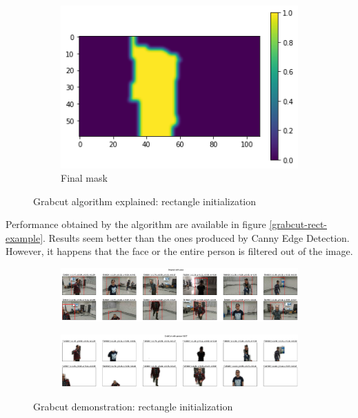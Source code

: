 \begin{figure}[!h]
\begin{center}
\begin{subfigure}[h]{0.32\textwidth}
			\includegraphics[width=1\textwidth]{"contents/images/04-2grabcut-1rect-steps-3"}
			\caption[]{Final mask}
			\label{fig:grabcut-rect-explain-3}
		\end{subfigure}
	\end{center}
	\vspace{-0.5cm}
	\caption[Grabcut algorithm explained: rectangle initialization]{Grabcut algorithm explained: rectangle initialization}
	\label{fig:grabcut-rect-explain}
\end{figure}

Performance obtained by the algorithm are available in figure \ref{grabcut-rect-example}. Results seem better than the ones produced by Canny Edge Detection. However, it happens that the face or the entire person is filtered out of the image.

\begin{figure}[!h]
	\begin{center}
		\begin{subfigure}[h]{1\textwidth}
			\centering
			\includegraphics[width=1\textwidth]{"contents/images/04-2grabcut-1rect-example-1"}
		\end{subfigure}
		\vfill
		\begin{subfigure}[h]{1\textwidth}
			\centering
			\includegraphics[width=1\textwidth]{"contents/images/04-2grabcut-1rect-example-2"}
		\end{subfigure}
	\end{center}
	\vspace{-0.5cm}
	\caption[Grabcut demonstration: rectangle initialization]{Grabcut demonstration: rectangle initialization}
	\label{fig:grabcut-rect-example}
\end{figure}


